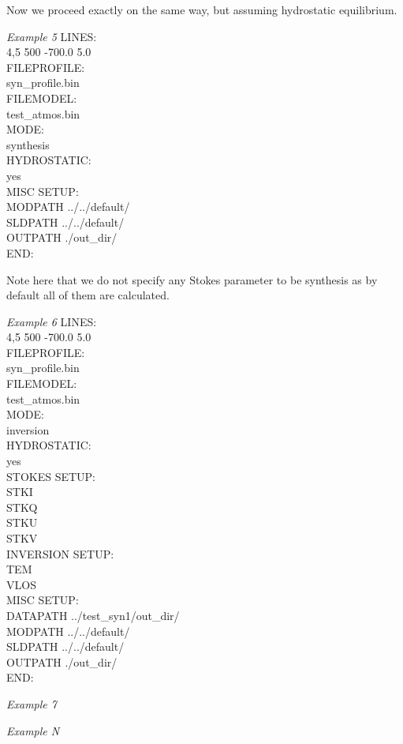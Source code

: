 %

Now we proceed exactly on the same way, but assuming hydrostatic equilibrium.

\begin{ifbox}[label={tb:example05}]{{\it Example 5}}
  \scriptsize
LINES:\\
4,5 500 -700.0 5.0\\
FILEPROFILE:\\
syn\_profile.bin\\
FILEMODEL:\\
test\_atmos.bin\\
MODE:\\
synthesis\\
HYDROSTATIC:\\
yes\\
MISC SETUP:\\
MODPATH ../../default/\\
SLDPATH ../../default/\\
OUTPATH ./out\_dir/\\
END:
  \normalsize
\end{ifbox}

Note here that we do not specify any Stokes parameter to be synthesis as by default all of them are calculated.

%

\begin{ifbox}[label={tb:example06}]{{\it Example 6}}
  \scriptsize
LINES:\\
4,5 500 -700.0 5.0\\
FILEPROFILE:\\
syn\_profile.bin\\
FILEMODEL:\\
test\_atmos.bin\\
MODE:\\
inversion\\
HYDROSTATIC:\\
yes\\
STOKES SETUP:\\
STKI\\
STKQ\\
STKU\\
STKV\\
INVERSION SETUP:\\
TEM\\
VLOS\\
MISC SETUP:\\
DATAPATH ../test\_syn1/out\_dir/\\
MODPATH ../../default/\\
SLDPATH ../../default/\\
OUTPATH ./out\_dir/\\
END:
  \normalsize
\end{ifbox}




%

\begin{ifbox}[label={tb:example07}]{{\it Example 7}}
  \scriptsize
  \normalsize
\end{ifbox}




%

\begin{ifbox}[label={tb:example0N}]{{\it Example N}}
  \scriptsize
  \normalsize
\end{ifbox}



